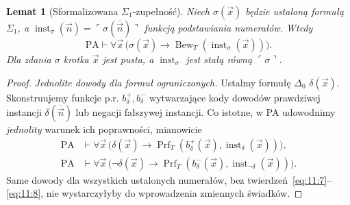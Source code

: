 \documentclass[11pt,a4paper]{article}
\numberwithin{equation}{section}
\newcommand{\PA}{\mathrm{PA}}
\theoremstyle{plain}
\newtheorem{lemat}[twierdzenie]{Lemat}
\theoremstyle{definition}
\theoremstyle{remark}
\begin{document}
\begin{lemat}[Sformalizowana $\Sigma_1$-zupełność]\label{res:11:5}
Niech $\sigma(\vec x)$ będzie ustaloną formułą $\Sigma_1$, a $\operatorname{inst}_\sigma(\vec n)=\ulcorner\sigma(\overline{\vec n})\urcorner$ funkcją podstawiania numerałów. Wtedy
\begin{equation}\label{eq:11:6}
\PA\vdash\forall\vec x\,\bigl(\sigma(\vec x)
\to\operatorname{Bew}_T(\operatorname{inst}_\sigma(\vec x))\bigr).
\end{equation}
Dla zdania $\sigma$ krotka $\vec x$ jest pusta, a $\operatorname{inst}_\sigma$ jest stałą równą $\ulcorner\sigma\urcorner$.
\end{lemat}
\begin{proof}
\emph{Jednolite dowody dla formuł ograniczonych.} Ustalmy formułę $\Delta_0$ $\delta(\vec x)$. Skonstruujemy funkcje p.r. $b_\delta^+,b_\delta^-$ wytwarzające kody dowodów prawdziwej instancji $\delta(\overline{\vec n})$ lub negacji fałszywej instancji. Co istotne, w PA udowodnimy \emph{jednolity} warunek ich poprawności, mianowicie
\begin{align}
\PA&\vdash\forall\vec x\,\bigl(\delta(\vec x)\to
\operatorname{Prf}_T(b_\delta^+(\vec x),\operatorname{inst}_\delta(\vec x))\bigr),\label{eq:11:7}\\
\PA&\vdash\forall\vec x\,\bigl(\neg\delta(\vec x)\to
\operatorname{Prf}_T(b_\delta^-(\vec x),\operatorname{inst}_{\neg\delta}(\vec x))\bigr).\label{eq:11:8}
\end{align}
Same dowody dla wszystkich ustalonych numerałów, bez twierdzeń~\eqref{eq:11:7}--\eqref{eq:11:8}, nie wystarczyłyby do wprowadzenia zmiennych świadków.


\end{proof}
\end{document}
